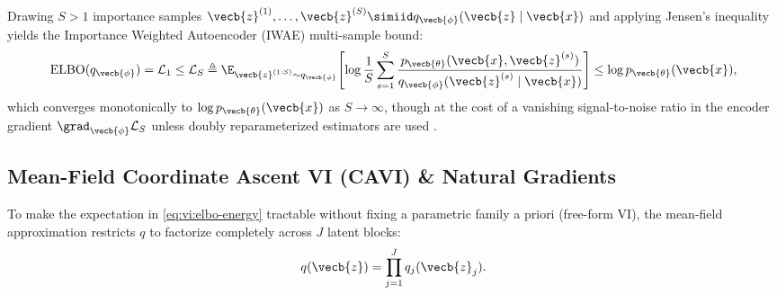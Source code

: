 \documentclass[../../../../master.tex]{subfiles}
\begin{document}
Drawing $S > 1$ importance samples $\vecb{z}^{(1)}, \dots, \vecb{z}^{(S)} \simiid q_{\vecb{\phi}}(\vecb{z} \mid \vecb{x})$ and applying Jensen's inequality~ yields the Importance Weighted Autoencoder (IWAE) multi-sample bound:
\begin{equation}
  \mathrm{ELBO}(q_{\vecb{\phi}}) = \mathcal{L}_1 \le \mathcal{L}_S \triangleq \E_{\vecb{z}^{(1:S)} \sim q_{\vecb{\phi}}}\!\left[\log \frac{1}{S}\sum_{s=1}^S \frac{p_{\vecb{\theta}}(\vecb{x}, \vecb{z}^{(s)})}{q_{\vecb{\phi}}(\vecb{z}^{(s)} \mid \vecb{x})}\right] \le \log p_{\vecb{\theta}}(\vecb{x}),
  \label{eq:vi:iwae}
\end{equation}
which converges monotonically to $\log p_{\vecb{\theta}}(\vecb{x})$ as $S \to \infty$, though at the cost of a vanishing signal-to-noise ratio in the encoder gradient $\grad_{\vecb{\phi}} \mathcal{L}_S$ unless doubly reparameterized estimators are used .

\subsection{Mean-Field Coordinate Ascent VI (CAVI) \& Natural Gradients}

To make the expectation in \eqref{eq:vi:elbo-energy} tractable without fixing a parametric family a priori (free-form VI), the mean-field approximation restricts $q$ to factorize completely across $J$ latent blocks:
\begin{equation}
  q(\vecb{z}) = \prod_{j=1}^J q_j(\vecb{z}_j).
  \label{eq:vi:mean-field}
\end{equation}
\end{document}
